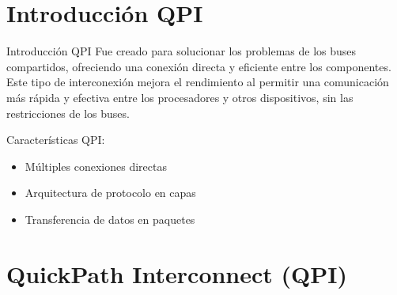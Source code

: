 \documentclass[presentation]{beamer}
\begin{document}
\section{Introducción QPI}
\label{sec:orgb30373c}
\begin{frame}[label={sec:orge4b4d38}]{Introducción QPI}
Fue creado para solucionar los problemas de los buses compartidos, ofreciendo una conexión directa
y eficiente entre los componentes. Este tipo de interconexión mejora el rendimiento al permitir
una comunicación más rápida y efectiva entre los procesadores y otros dispositivos, sin las
restricciones de los buses. 
\par
\end{frame}
\begin{frame}[label={sec:orgb414139}]{Características QPI:}
\begin{itemize}
\item Múltiples conexiones directas
\item Arquitectura de protocolo en capas
\item Transferencia de datos en paquetes
\end{itemize}
\end{frame}

\section{QuickPath Interconnect (QPI)}
\label{sec:org610ebf8}
\end{document}
